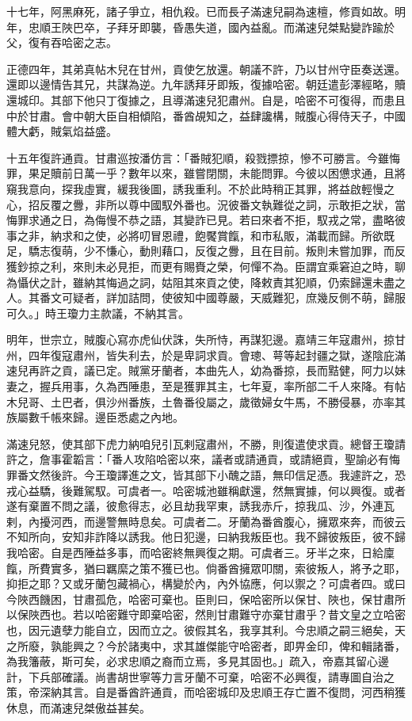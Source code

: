 \begin{pinyinscope}
十七年，阿黑麻死，諸子爭立，相仇殺。已而長子滿速兒嗣為速檀，修貢如故。明年，忠順王陜巴卒，子拜牙即襲，昏愚失道，國內益亂。而滿速兒桀點變詐踰於父，復有吞哈密之志。

正德四年，其弟真帖木兒在甘州，貢使乞放還。朝議不許，乃以甘州守臣奏送還。還即以邊情告其兄，共謀為逆。九年誘拜牙即叛，復據哈密。朝廷遣彭澤經略，贖還城印。其部下他只丁復據之，且導滿速兒犯肅州。自是，哈密不可復得，而患且中於甘肅。會中朝大臣自相傾陷，番酋覘知之，益肆讒構，賊腹心得侍天子，中國體大虧，賊氣焰益盛。

十五年復許通貢。甘肅巡按潘仿言：「番賊犯順，殺戮摽掠，慘不可勝言。今雖悔罪，果足贖前日萬一乎？數年以來，雖嘗閉關，未能問罪。今彼以困憊求通，且將窺我意向，探我虛實，緩我後圖，誘我重利。不於此時稍正其罪，將益啟輕慢之心，招反覆之釁，非所以尊中國馭外番也。況彼番文執難從之詞，示敢拒之狀，當悔罪求通之日，為侮慢不恭之語，其變詐已見。若曰來者不拒，馭戎之常，盡略彼事之非，納求和之使，必將叨冒恩禮，飽饜賞餼，和市私販，滿載而歸。所欲既足，驕志復萌，少不慊心，動則藉口，反復之釁，且在目前。叛則未嘗加罪，而反獲鈔掠之利，來則未必見拒，而更有賜賚之榮，何憚不為。臣謂宜乘窘迫之時，聊為懾伏之計，雖納其悔過之詞，姑阻其來貢之使，降敕責其犯順，仍索歸還未盡之人。其番文可疑者，詳加詰問，使彼知中國尊嚴，天威難犯，庶幾反側不萌，歸服可久。」時王瓊力主款議，不納其言。

明年，世宗立，賊腹心寫亦虎仙伏誅，失所恃，再謀犯邊。嘉靖三年寇肅州，掠甘州，四年復寇肅州，皆失利去，於是卑詞求貢。會璁、萼等起封疆之獄，遂陰庇滿速兒再許之貢，議已定。賊黨牙蘭者，本曲先人，幼為番掠，長而黠健，阿力以妹妻之，握兵用事，久為西陲患，至是獲罪其主，七年夏，率所部二千人來降。有帖木兒哥、土巴者，俱沙州番族，土魯番役屬之，歲徵婦女牛馬，不勝侵暴，亦率其族屬數千帳來歸。邊臣悉處之內地。

滿速兒怒，使其部下虎力納咱兒引瓦剌寇肅州，不勝，則復遣使求貢。總督王瓊請許之，詹事霍韜言：「番人攻陷哈密以來，議者或請通貢，或請絕貢，聖諭必有悔罪番文然後許。今王瓊譯進之文，皆其部下小醜之語，無印信足憑。我遽許之，恐戎心益驕，後難駕馭。可虞者一。哈密城池雖稱獻還，然無實據，何以興復。或者遂有棄置不問之議，彼愈得志，必且劫我罕東，誘我赤斤，掠我瓜、沙，外連瓦剌，內擾河西，而邊警無時息矣。可虞者二。牙蘭為番酋腹心，擁眾來奔，而彼云不知所向，安知非詐降以誘我。他日犯邊，曰納我叛臣也。我不歸彼叛臣，彼不歸我哈密。自是西陲益多事，而哈密終無興復之期。可虞者三。牙半之來，日給廩餼，所費實多，猶曰羈縻之策不獲已也。倘番酋擁眾叩關，索彼叛人，將予之耶，抑拒之耶？又或牙蘭包藏禍心，構變於內，內外協應，何以禦之？可虞者四。或曰今陜西饑困，甘肅孤危，哈密可棄也。臣則曰，保哈密所以保甘、陜也，保甘肅所以保陜西也。若以哈密難守即棄哈密，然則甘肅難守亦棄甘肅乎？昔文皇之立哈密也，因元遺孽力能自立，因而立之。彼假其名，我享其利。今忠順之嗣三絕矣，天之所廢，孰能興之？今於諸夷中，求其雄傑能守哈密者，即畀金印，俾和輯諸番，為我籓蔽，斯可矣，必求忠順之裔而立焉，多見其固也。」疏入，帝嘉其留心邊計，下兵部確議。尚書胡世寧等力言牙蘭不可棄，哈密不必興復，請專圖自治之策，帝深納其言。自是番酋許通貢，而哈密城印及忠順王存亡置不復問，河西稍獲休息，而滿速兒桀傲益甚矣。


\end{pinyinscope}
